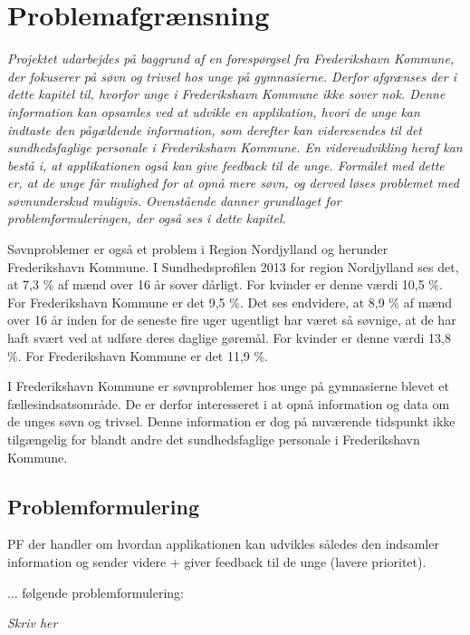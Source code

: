 \chapter{Problemafgrænsning}
\label{cha:problemafgraensning}

\textit{Projektet udarbejdes på baggrund af en forespørgsel fra Frederikshavn Kommune, der fokuserer på søvn og trivsel hos unge på gymnasierne. Derfor afgrænses der i dette kapitel til, hvorfor unge i Frederikshavn Kommune ikke sover nok. Denne information kan opsamles ved at udvikle en applikation, hvori de unge kan indtaste den pågældende information, som derefter kan videresendes til det sundhedsfaglige personale i Frederikshavn Kommune. En videreudvikling heraf kan bestå i, at applikationen også kan give feedback til de unge. Formålet med dette er, at de unge får mulighed for at opnå mere søvn, og derved løses problemet med søvnunderskud muligvis. Ovenstående danner grundlaget for problemformuleringen, der også ses i dette kapitel.}


Søvnproblemer er også et problem i Region Nordjylland og herunder Frederikshavn Kommune. I Sundhedsprofilen 2013 for region Nordjylland \cite{Hayes2014} ses det, at 7,3 \% af mænd over 16 år sover dårligt. For kvinder er denne værdi 10,5 \%. For Frederikshavn Kommune er det 9,5 \%. Det ses endvidere, at 8,9 \% af mænd over 16 år inden for de seneste fire uger ugentligt har været så søvnige, at de har haft svært ved at udføre deres daglige gøremål. For kvinder er denne værdi 13,8 \%. For Frederikshavn Kommune er det 11,9 \%. \cite[kap. 5]{Hayes2014} 


I Frederikshavn Kommune er søvnproblemer hos unge på gymnasierne blevet et fællesindsatsområde. De er derfor interesseret i at opnå information og data om de unges søvn og trivsel. Denne information er dog på nuværende tidspunkt ikke tilgængelig for blandt andre det sundhedsfaglige personale i Frederikshavn Kommune. 



\section{Problemformulering}
\label{sec:problemformulering}


PF der handler om hvordan applikationen kan udvikles således den indsamler information og sender videre + giver feedback til de unge (lavere prioritet). 


... følgende problemformulering:
\begin{center}
\textit{Skriv her}
\end{center}